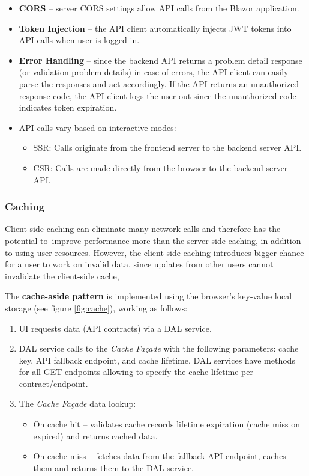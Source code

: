 \begin{itemize}
    \item \textbf{CORS} -- server CORS settings allow API calls from the Blazor application.

    \item \textbf{Token Injection} -- the API client automatically injects JWT tokens into API calls when user is logged in.

    \item \textbf{Error Handling} -- since the backend API returns a problem detail response (or validation problem details) in case of errors, the API client can easily parse the responses and act accordingly. If the API returns an unauthorized response code, the API client logs the user out since the unauthorized code indicates token expiration.

    \item API calls vary based on interactive modes:
    \begin{itemize}
        \item SSR: Calls originate from the frontend server to the backend server API.
        \item CSR: Calls are made directly from the browser to the backend server API.
    \end{itemize}
\end{itemize}

\subsubsection{Caching}
Client-side caching can eliminate many network calls and therefore has the potential to~improve performance more than the server-side caching, in addition to using user resources. However, the client-side caching introduces bigger chance for a user to work on invalid data, since updates from other users cannot invalidate the client-side cache,

The \textbf{cache-aside pattern} is implemented using the browser's key-value local storage (see figure \ref{fig:cache}), working as follows:

\begin{enumerate}
    \item UI requests data (API contracts) via a DAL service.

    \item DAL service calls to the \textit{Cache Façade} with the following parameters: cache key, API fallback endpoint, and cache lifetime. DAL services have methods for all GET endpoints allowing to specify the cache lifetime per contract/endpoint.

    \item The \textit{Cache Façade} data lookup:
    \begin{itemize}
        \item On cache hit -- validates cache records lifetime expiration (cache miss on expired) and returns cached data.

        \item On cache miss -- fetches data from the fallback API endpoint, caches them and returns them to the DAL service.
    \end{itemize}
\end{enumerate}

